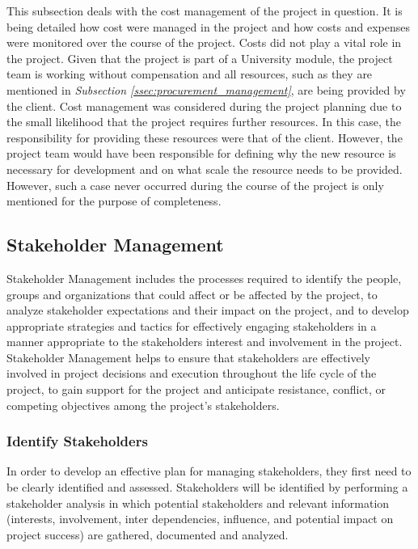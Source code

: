 This subsection deals with the cost management of the project in question. It is being detailed how cost were managed in the project and how costs and expenses were monitored over the course of the project.
\newline
Costs did not play a vital role in the project. Given that the project is part of a University module, the project team is working without compensation and all resources, such as they are mentioned in \textit{Subsection \ref{ssec:procurement_management}}, are being provided by the client.
\newline
Cost management was considered during the project planning due to the small likelihood that the project requires further resources. In this case, the responsibility for providing these resources were that of the client. However, the project team would have been responsible for defining why the new resource is necessary for development and on what scale the resource needs to be provided. However, such a case never occurred during the course of the project is only mentioned for the purpose of completeness.



\subsection{Stakeholder Management}
\label{ssec:stakeholder_management}

Stakeholder Management includes the processes required to identify the people, groups and organizations that could affect or be affected by the project, to analyze stakeholder expectations and their impact on the project, and to develop appropriate strategies and tactics for effectively engaging stakeholders in a manner appropriate to the stakeholders interest and involvement in the project. Stakeholder Management helps to ensure that stakeholders are effectively involved in project decisions and execution throughout the life cycle of the project, to gain support for the project and anticipate resistance, conflict, or competing objectives among the project’s stakeholders.

\subsubsection{Identify Stakeholders}
\label{sssec:identify_stakeholders}

In order to develop an effective plan for managing stakeholders, they first need to be clearly identified and assessed. Stakeholders will be identified by performing a stakeholder analysis in which potential stakeholders and relevant information (interests, involvement, inter dependencies, influence, and potential impact on project success) are gathered, documented and analyzed. 


